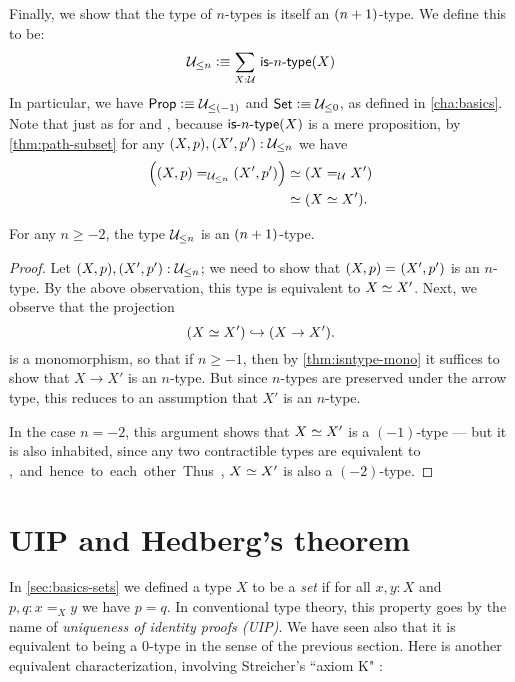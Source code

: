 Finally, we show that the type of $n$-types is itself an $\nplusone$-type.
We define this to be:
\[\ntype{n} \defeq \sm{X : \type} \istype{n}(X) \]
In particular, we have $\prop \defeq \ntype{(-1)}$ and $\set \defeq \ntype{0}$, as defined in \autoref{cha:basics}.
Note that just as for \prop and \set, because $\istype{n}(X)$ is a mere proposition, by \autoref{thm:path-subset} for any $(X,p), (X',p'):\ntype{n}$ we have
\begin{align*}
  \Big(\id[\ntype{n}]{(X, p)}{(X', p')}\Big) &\simeq (\id[\type] X X')\\
  &\simeq (\eqv{X}{X'}).
\end{align*}

\begin{thm}\label{thm:hleveln-of-hlevelSn}
 For any $n \geq -2$, the type $\ntype{n}$ is an $\nplusone$-type.
\end{thm}
\begin{proof}%
  Let $(X, p), (X', p') : \ntype{n}$; we need to show that $\id{(X, p)}{(X', p')}$ is an $n$-type.
  By the above observation, this type is equivalent to $\eqv{X}{X'}$.
  Next, we observe that the projection
  \[(\eqv{X}{X'}) \hookrightarrow (X \rightarrow X').\]
  is a monomorphism, so that if $n\geq -1$, then by \autoref{thm:isntype-mono} it suffices to show that $X \rightarrow X'$ is an $n$-type.
  But since $n$-types are preserved under the arrow type, this reduces to an assumption that $X'$ is an $n$-type.

  In the case $n=-2$, this argument shows that $\eqv{X}{X'}$ is a $(-1)$-type --- but it is also inhabited, since any two contractible types
are equivalent to \unit, and hence to each other.
  Thus, $\eqv{X}{X'}$ is also a $(-2)$-type.
\end{proof}

\section{UIP and Hedberg's theorem}
\label{sec:hedberg}

In \autoref{sec:basics-sets} we defined a type $X$ to be a \emph{set} if for all $x, y : X$ and $p, q : x =_X y$ we have $p = q$.
In conventional type theory, this property goes by the name of \emph{uniqueness of identity proofs (UIP)}.
We have seen also that it is equivalent to being a $0$-type in the sense of the previous section.
Here is another equivalent characterization, involving Streicher's ``axiom K" \cite{StreicherK}:


